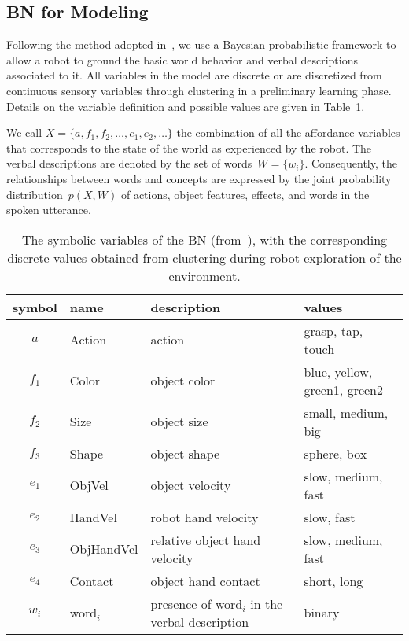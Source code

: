 \subsection{\acl{BN} for \AffWords{} Modeling}
\label{sec:bn}

Following the method adopted in~\cite{salvi:2012:smcb}, we use a Bayesian probabilistic framework to allow a robot to ground the basic world behavior and verbal descriptions associated to it.
All variables in the model are discrete or are discretized from continuous sensory variables through clustering in a preliminary learning phase.
Details on the variable definition and possible values are given in Table~\ref{tab:bnsymb}.

We call $X = \{a, f_1, f_2, \dots, e_1, e_2, \dots\}$ the combination of all the affordance variables that corresponds to the state of the world as experienced by the robot. The verbal descriptions are denoted by the set of words~$W = \{w_i\}$. Consequently, the relationships between words and concepts are expressed by the joint probability distribution~$p(X,W)$ of actions, object features, effects, and words in the spoken utterance.

\begin{table}
    \centering
    \caption{The symbolic variables of the \acl{BN} (from~\cite{salvi:2012:smcb}), with the corresponding discrete values obtained from clustering during robot exploration of the environment.}
    \label{tab:bnsymb}
    \begin{tabular}{clp{2.7cm}p{2.5cm}}
    \toprule
    symbol & name   & description     & values \\
    \midrule
    $a$ & Action & action          & grasp, tap, touch \\
    \midrule
    $f_1$ & Color   & object color   & blue, yellow, green1, green2 \\
    $f_2$ & Size   & object size     & small, medium, big \\
    $f_3$ & Shape  & object shape    & sphere, box \\
    \midrule
    $e_1$ & ObjVel & object velocity & slow, medium, fast \\
    $e_2$ & HandVel & robot hand velocity & slow, fast \\
    $e_3$ & ObjHandVel & relative object hand velocity & slow, medium, fast \\
    $e_4$ & Contact & object hand contact & short, long \\
    \midrule
    $w_i$ & word$_i$ & presence of word$_i$ in the verbal description & binary \\
    \bottomrule
    \end{tabular}
\end{table}

